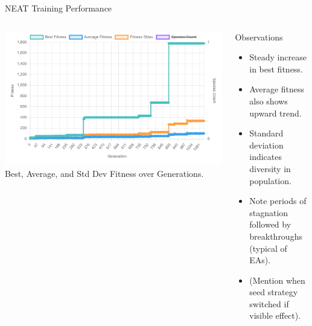 \documentclass{beamer}
\begin{document}
\begin{frame}{NEAT Training Performance}
  \begin{columns}[T]
    \begin{column}{0.65\textwidth}
      \centering
      \includegraphics[width=\linewidth]{media/neat_custom_fitness_curve.png}
      \tiny Best, Average, and Std Dev Fitness over Generations.
    \end{column}
    \begin{column}{0.35\textwidth}
      \begin{block}{Observations}
        \begin{itemize}
            \item Steady increase in best fitness.
            \item Average fitness also shows upward trend.
            \item Standard deviation indicates diversity in population.
            \item Note periods of stagnation followed by breakthroughs (typical of EAs).
            \item (Mention when seed strategy switched if visible effect).
        \end{itemize}
      \end{block}
    \end{column}
  \end{columns}
\end{frame}
\end{document}
